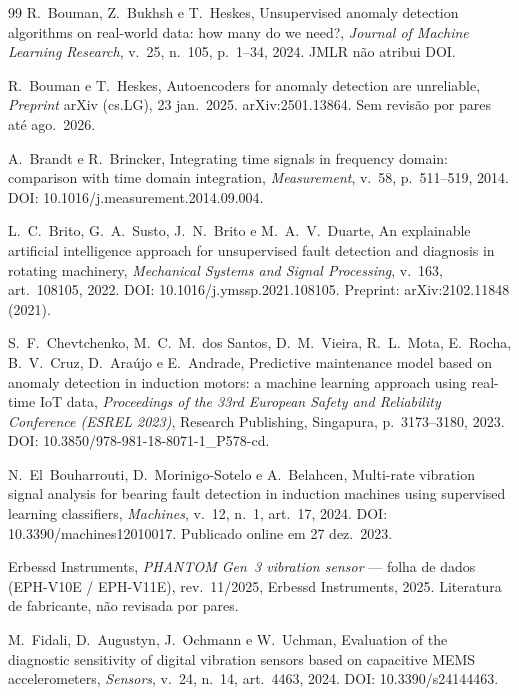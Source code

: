 \documentclass[11pt,a4paper]{article}
\begin{document}
\begin{thebibliography}{99}
R.~Bouman, Z.~Bukhsh e T.~Heskes,
\newblock Unsupervised anomaly detection algorithms on real-world data: how many do we need?,
\newblock \emph{Journal of Machine Learning Research}, v.~25, n.~105, p.~1--34, 2024.
\newblock JMLR não atribui DOI.

R.~Bouman e T.~Heskes,
\newblock Autoencoders for anomaly detection are unreliable,
\newblock \emph{Preprint} arXiv (cs.LG), 23 jan.\ 2025.
\newblock arXiv:2501.13864. Sem revisão por pares até ago.\ 2026.

A.~Brandt e R.~Brincker,
\newblock Integrating time signals in frequency domain: comparison with time domain integration,
\newblock \emph{Measurement}, v.~58, p.~511--519, 2014.
\newblock DOI: 10.1016/j.measurement.2014.09.004.

L.~C.~Brito, G.~A.~Susto, J.~N.~Brito e M.~A.~V.~Duarte,
\newblock An explainable artificial intelligence approach for unsupervised fault detection and diagnosis in rotating machinery,
\newblock \emph{Mechanical Systems and Signal Processing}, v.~163, art.~108105, 2022.
\newblock DOI: 10.1016/j.ymssp.2021.108105. Preprint: arXiv:2102.11848 (2021).

S.~F.~Chevtchenko, M.~C.~M.~dos Santos, D.~M.~Vieira, R.~L.~Mota, E.~Rocha, B.~V.~Cruz, D.~Araújo e E.~Andrade,
\newblock Predictive maintenance model based on anomaly detection in induction motors: a machine learning approach using real-time IoT data,
\newblock \emph{Proceedings of the 33rd European Safety and Reliability Conference (ESREL 2023)}, Research Publishing, Singapura, p.~3173--3180, 2023.
\newblock DOI: 10.3850/978-981-18-8071-1\_P578-cd.

N.~El~Bouharrouti, D.~Morinigo-Sotelo e A.~Belahcen,
\newblock Multi-rate vibration signal analysis for bearing fault detection in induction machines using supervised learning classifiers,
\newblock \emph{Machines}, v.~12, n.~1, art.~17, 2024.
\newblock DOI: 10.3390/machines12010017. Publicado online em 27 dez.\ 2023.

Erbessd Instruments,
\newblock \emph{PHANTOM Gen~3 vibration sensor} --- folha de dados (EPH-V10E / EPH-V11E), rev.\ 11/2025,
\newblock Erbessd Instruments, 2025.
\newblock Literatura de fabricante, não revisada por pares.

M.~Fidali, D.~Augustyn, J.~Ochmann e W.~Uchman,
\newblock Evaluation of the diagnostic sensitivity of digital vibration sensors based on capacitive MEMS accelerometers,
\newblock \emph{Sensors}, v.~24, n.~14, art.~4463, 2024.
\newblock DOI: 10.3390/s24144463.


\end{thebibliography}
\end{document}
